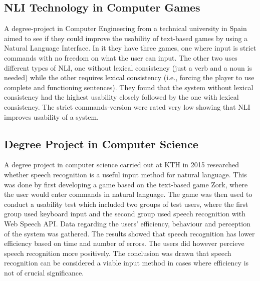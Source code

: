 \subsection{NLI Technology in Computer Games}
A degree-project in Computer Engineering from a technical university in Spain aimed to see if they could improve the usability of text-based games by using a Natural Language Interface. In it they have three games, one where input is strict commands with no freedom on what the user can input. The other two uses different types of NLI, one without lexical consistency (just a verb and a noun is needed) while the other requires lexical consistency (i.e., forcing the player to use complete and functioning sentences). They found that the system without lexical consistency had the highest usability closely followed by the one with lexical consistency. The strict commands-version were rated very low showing that NLI improves usability of a system. \citep{Memo}

\subsection{Degree Project in Computer Science} %
A degree project in computer science carried out at KTH in 2015 researched whether speech recognition is a useful input method for natural language. This was done by first developing a game based on the text-based game Zork, where the user would enter commands in natural language. The game was then used to conduct a usability test which included two groups of test users, where the first group used keyboard input and the second group used speech recognition with Web Speech API. Data regarding the users' efficiency, behaviour and perception of the system was gathered. The results showed that speech recognition has lower efficiency based on time and number of errors. The users did however percieve speech recognition more positively. The conclusion was drawn that speech recognition can be considered a viable input method in cases where efficiency is not of crucial significance. \citep{qvar}